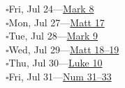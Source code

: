 \hypertarget{rp-2026-07-24}{}\noindent$\square$\enspace Fri, Jul 24\enspace---\enspace \hyperlink{ch-mark-8}{Mark 8}\\
\hypertarget{rp-2026-07-27}{}\noindent$\square$\enspace Mon, Jul 27\enspace---\enspace \hyperlink{ch-matthew-17}{Matt 17}\\
\hypertarget{rp-2026-07-28}{}\noindent$\square$\enspace Tue, Jul 28\enspace---\enspace \hyperlink{ch-mark-9}{Mark 9}\\
\hypertarget{rp-2026-07-29}{}\noindent$\square$\enspace Wed, Jul 29\enspace---\enspace \hyperlink{ch-matthew-18}{Matt 18--19}\\
\hypertarget{rp-2026-07-30}{}\noindent$\square$\enspace Thu, Jul 30\enspace---\enspace \hyperlink{ch-luke-10}{Luke 10}\\
\hypertarget{rp-2026-07-31}{}\noindent$\square$\enspace Fri, Jul 31\enspace---\enspace \hyperlink{ch-numbers-31}{Num 31--33}\\
\clearpage
\twocolumn[%
  \vspace*{20pt}%
  {\centering\huge\booktitlefont\scshape August 2026\\%
  \char"2766\par}%
  \vspace{10pt}%
]

